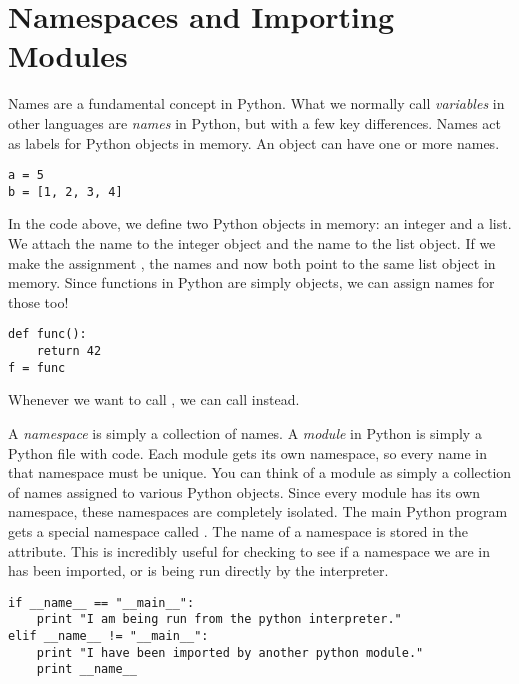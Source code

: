\section*{Namespaces and Importing Modules}
Names are a fundamental concept in Python.
What we normally call \emph{variables} in other languages are \emph{names} in Python, but with a few key differences.
Names act as labels for Python objects in memory.
An object can have one or more names.
\begin{lstlisting}
a = 5
b = [1, 2, 3, 4]
\end{lstlisting}
In the code above, we define two Python objects in memory: an integer and a list.
We attach the name  to the integer object and the name  to the list object.
If we make the assignment , the names  and  now both point to the same list object in memory.
Since functions in Python are simply objects, we can assign names for those too!
\begin{lstlisting}
def func():
    return 42
f = func
\end{lstlisting}
Whenever we want to call , we can call  instead.

A \emph{namespace} is simply a collection of names.
A \emph{module} in Python is simply a Python file with code.
Each module gets its own namespace, so every name in that namespace must be unique.
You can think of a module as simply a collection of names assigned to various Python objects.
Since every module has its own namespace, these namespaces are completely isolated.
The main Python program gets a special namespace called .
The name of a namespace is stored in the  attribute.
This is incredibly useful for checking to see if a namespace we are in has been imported, or is being run directly by the interpreter.
\begin{lstlisting}
if __name__ == "__main__":
    print "I am being run from the python interpreter."
elif __name__ != "__main__":
    print "I have been imported by another python module."
    print __name__
\end{lstlisting}

